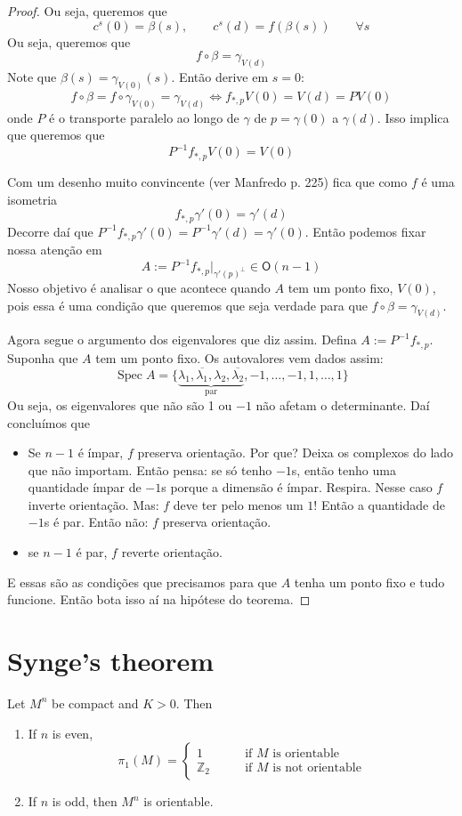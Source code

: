 \begin{proof}
Ou seja, queremos que
$$
c^s(0)=\beta(s),\qquad
c^s(d)=f(\beta(s))\qquad \forall s
$$
Ou seja, queremos que
$$
f \circ \beta=\gamma_{V(d)}
$$
Note que $\beta(s)=\gamma_{V(0)}(s)$. Então
derive em $s=0$: \[f \circ
\beta=f\circ\gamma_{V(0)}=\gamma_{V(d)}\iff
f_{*,p}V(0)=V(d)=PV(0)\] onde $P$ é
o transporte paralelo ao longo de $\gamma$ de
$p=\gamma(0)$ a $\gamma(d)$.  Isso
implica que queremos que
\[P^{-1}f_{*,p}V(0)=V(0)\]

Com um desenho muito convincente (ver
Manfredo p. 225) fica que como $f$ é uma isometria
\[f_{*,p}\gamma'(0)=\gamma'(d)\]
Decorre daí que
$P^{-1}f_{*,p}\gamma'(0)=P^{-1}\gamma'(d)=
\gamma'(0)$.
Então
podemos fixar nossa atenção em
$$
A:=P^{-1}f_{*,p}|_{\gamma'(p)^\perp}\in
\mathsf{O}(n-1)
$$
Nosso objetivo é analisar o que acontece
quando $A$ tem um ponto fixo, $V(0)$,
pois essa é uma condição que queremos que
seja verdade para que $f\circ \beta =
\gamma_{V(d)}$.

Agora segue o argumento dos eigenvalores que
diz assim. Defina
$A:=P^{-1}f_{*,p}$. Suponha que $A$ tem um
ponto fixo. Os autovalores vem dados
assim:
$$
\operatorname{Spec}A=\{\underbrace{\lambda_1,
\overline{\lambda_1},\lambda_2,
\overline{\lambda_2}}_{\text{par}
},-1,\ldots,-1,1,\ldots,1\}
$$
Ou seja, os eigenvalores que não são 1 ou
$-1$ não afetam o determinante. Daí
concluímos que
\begin{itemize}
\item Se $n-1$ é ímpar, $f$ preserva
orientação. Por que? Deixa os complexos do
lado que não importam. Então pensa: se só
tenho $-1$s, então tenho uma
quantidade ímpar de $-1$s porque a dimensão é
ímpar. Respira. Nesse caso $f$
inverte orientação. Mas: $f$ deve ter pelo
menos um $1$! Então a quantidade de
$-1$s  é par. Então não: $f$ preserva
orientação.
\item se $n-1$ é par, $f$ reverte orientação.
\end{itemize}
E essas são as condições que precisamos para
que $A$ tenha um ponto fixo e tudo
funcione. Então bota isso aí na hipótese do
teorema.
\end{proof}

\section{Synge's theorem}
\label{section-Synge-theorem}

\begin{theorem}[Synge]
\label{theorem-Synge}
Let $M^n$ be compact and $K>0$. Then
\begin{enumerate}
\item If $n$ is even,
$$
\pi_1(M)=\begin{cases}
	1\qquad & \text{if $M$ is orientable}\\
	\mathbb{Z}_2\qquad & \text{if $M$ is not
	orientable}
\end{cases}
$$
\item If $n$ is odd, then $M^n$ is
orientable.
\end{enumerate}
\end{theorem}

